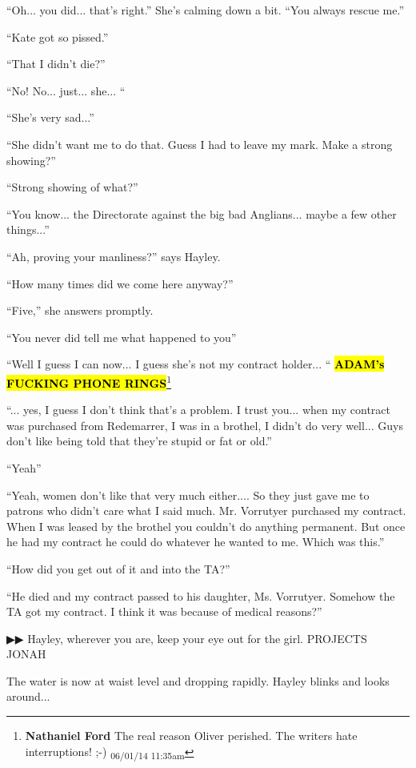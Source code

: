 ``Oh... you did... that's right.''  She's calming down a bit.  ``You always rescue me.''

``Kate got so pissed.''

``That I didn't die?''

``No! No... just... she... ``

``She's very sad...''

``She didn't want me to do that.  Guess I had to leave my mark.  Make a strong showing?''

``Strong showing of what?''

``You know... the Directorate against the big bad Anglians... maybe a few other things...''

``Ah, proving your manliness?'' says Hayley.

``How many times did we come here anyway?''

``Five,'' she answers promptly.

``You never did tell me what happened to you''

``Well I guess I can now... I guess she's not my contract holder... ``
\textbf{\hl{ADAM's FUCKING PHONE RINGS}}\footnote{\textbf{Nathaniel Ford }The real reason Oliver perished. The writers hate interruptions! ;-) \textsubscript{06/01/14 11:35am}}

``... yes, I guess I don't think that's a problem.  I trust you... when my contract was purchased from Redemarrer, I was in a brothel, I didn't do very well... Guys don't like being told that they're stupid or fat or old.''

``Yeah''

``Yeah, women don't like that very much either.... So they just gave me to patrons who didn't care what I said much.  Mr. Vorrutyer purchased my contract.  When I was leased by the brothel you couldn't do anything permanent.  But once he had my contract he could do whatever he wanted to me.  Which was this.''

``How did you get out of it and into the TA?''

``He died and my contract passed to his daughter, Ms. Vorrutyer.  Somehow the TA got my contract.  I think it was because of medical reasons?''



 {\color[RGB]{68,68,68}▶▶}  Hayley, wherever you are, keep your eye out for the girl.  PROJECTS JONAH



The water is now at waist level and dropping rapidly.  Hayley blinks and looks around... 

